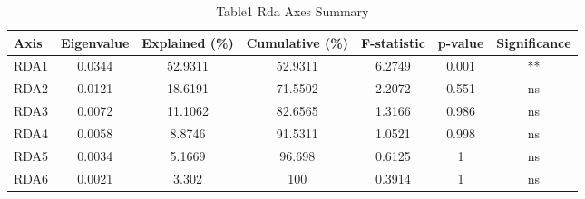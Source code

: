 
\begin{table}[htbp]
    \centering
    \small
    \caption{Table1 Rda Axes Summary}
    \label{tab:table1_rda_axes_summary}
    \begin{tabular}{lcccccc}
        \toprule
        Axis & Eigenvalue & Explained (\%) & Cumulative (\%) & F-statistic & p-value & Significance \\
        \midrule
        RDA1 & 0.0344 & 52.9311 & 52.9311 & 6.2749 & 0.001 & ** \\
        RDA2 & 0.0121 & 18.6191 & 71.5502 & 2.2072 & 0.551 & ns \\
        RDA3 & 0.0072 & 11.1062 & 82.6565 & 1.3166 & 0.986 & ns \\
        RDA4 & 0.0058 & 8.8746 & 91.5311 & 1.0521 & 0.998 & ns \\
        RDA5 & 0.0034 & 5.1669 & 96.698 & 0.6125 & 1 & ns \\
        RDA6 & 0.0021 & 3.302 & 100 & 0.3914 & 1 & ns \\
        \bottomrule
    \end{tabular}
\end{table}
